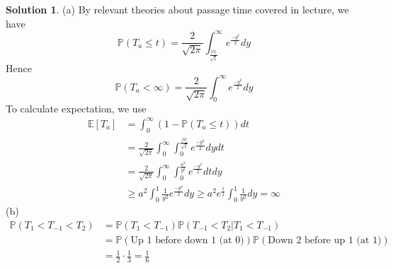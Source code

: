 \documentclass[a4paper, 10pt]{article}
\theoremstyle{definition}
\theoremstyle{hSol}
\newtheorem*{solution}{Solution}
\begin{document}
\begin{solution} (a) By relevant theories about passage time covered in lecture, we have
\begin{equation}
  \mathbb{P}\left(T_a \leq t\right) = \frac{2}{\sqrt{2\pi}} \int_{\frac{|a|}{\sqrt{t}}}^{\infty} e^{\frac{-y^2}{2}} dy
\end{equation}
Hence
\begin{equation}
  \mathbb{P}\left(T_a < \infty\right) = \frac{2}{\sqrt{2\pi}} \int_{0}^{\infty} e^{\frac{-y^2}{2}} dy
\end{equation}
To calculate expectation, we use
\begin{equation}
  \begin{split}
    \mathbb{E}\left[T_a\right] &= \int_{0}^{\infty} (1-\mathbb{P}\left(T_a\leq t\right))dt \\
    &= \frac{2}{\sqrt{2\pi}}\int_0^{\infty} \int_{0}^{\frac{|a|}{\sqrt{t}}}e^{\frac{-y^2}{2}}dydt \\
    &= \frac{2}{\sqrt{2\pi}}\int_0^{\infty} \int_{0}^{\frac{a^2}{y^2}}e^{\frac{-y^2}{2}}dt dy\\
    &\geq a^2 \int_0^1 \frac{1}{y^2} e^{\frac{-y^2}{2}}dy \geq a^2 e^{\frac{1}{2}}\int_0^1 \frac{1}{y^2} dy = \infty
  \end{split}
\end{equation}
(b) 
\begin{equation}
  \begin{split}
    \mathbb{P}\left(T_1<T_{-1}<T_2\right) &= \mathbb{P}\left(T_1<T_{-1}\right)\mathbb{P}\left(T_{-1}<T_2|T_1<T_{-1}\right) \\
    &=\mathbb{P}\left(\text{Up 1 before down 1 (at 0)}\right)\mathbb{P}\left(\text{Down 2 before up 1 (at 1)}\right) \\
    &= \frac{1}{2} \cdot \frac{1}{3} = \frac{1}{6}
  \end{split}
\end{equation}
\end{solution}
\end{document}
